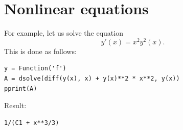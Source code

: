 \documentclass{article}
\begin{document}



\section{Nonlinear equations}

For example, let us solve the equation 
$$
  y'(x) = x^2 y^2(x).
$$
This is done as follows:
\begin{verbatim}
y = Function('f')
A = dsolve(diff(y(x), x) + y(x)**2 * x**2, y(x))
pprint(A)
\end{verbatim}
Result:
\begin{verbatim}
1/(C1 + x**3/3)
\end{verbatim}

\end{document}
